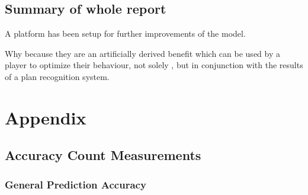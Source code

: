 \documentclass[parskip]{cs4rep}
\begin{document}
\section{Summary of whole report}

A platform has been setup for further improvements of the model.

Why because they are an artificially derived benefit which can be used by a player to optimize their behaviour, not solely , but in conjunction with the results of a plan recognition system.

\chapter{Appendix}

\section{Accuracy Count Measurements}

\subsection{General Prediction Accuracy}
\end{document}

